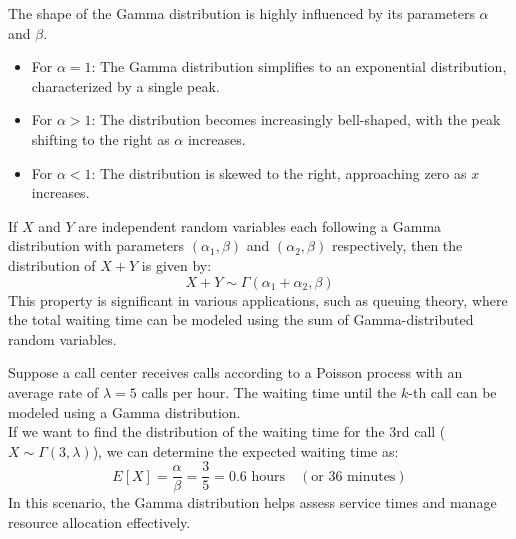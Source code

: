 The shape of the Gamma distribution is highly influenced by its parameters \(\alpha\) and \(\beta\). 

\begin{itemize}
    \item For \(\alpha = 1\): The Gamma distribution simplifies to an exponential distribution, characterized by a single peak.
    \item For \(\alpha > 1\): The distribution becomes increasingly bell-shaped, with the peak shifting to the right as \(\alpha\) increases.
    \item For \(\alpha < 1\): The distribution is skewed to the right, approaching zero as \(x\) increases.
\end{itemize}

\begin{center}
    \end{center}

    If \(X\) and \(Y\) are independent random variables each following a Gamma distribution with parameters \((\alpha_1, \beta)\) and \((\alpha_2, \beta)\) respectively, then the distribution of \(X + Y\) is given by:
    \[
    X + Y \sim \Gamma(\alpha_1 + \alpha_2, \beta)
    \]
    This property is significant in various applications, such as queuing theory, where the total waiting time can be modeled using the sum of Gamma-distributed random variables.

    \begin{example}
        Suppose a call center receives calls according to a Poisson process with an average rate of \(\lambda = 5\) calls per hour. The waiting time until the \(k\)-th call can be modeled using a Gamma distribution. \\

If we want to find the distribution of the waiting time for the 3rd call (\(X \sim \Gamma(3, \lambda)\)), we can determine the expected waiting time as:
\[
E[X] = \frac{\alpha}{\beta} = \frac{3}{5} = 0.6 \text{ hours} \quad (\text{or } 36 \text{ minutes})
\]
In this scenario, the Gamma distribution helps assess service times and manage resource allocation effectively.
    \end{example}

